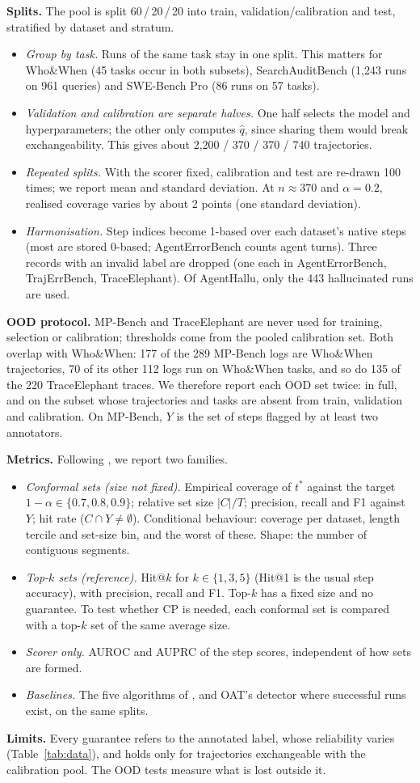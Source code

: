 \documentclass[10pt,a4paper]{article}
\newcommand{\tstar}{t^{*}}
\newcommand{\qhat}{\hat q}
\newcommand{\C}{C}
\begin{document}
\textbf{Splits.} The pool is split 60\,/\,20\,/\,20 into train, validation/calibration and test, stratified by dataset and stratum.
\begin{itemize}
\item \emph{Group by task.} Runs of the same task stay in one split. This matters for Who\&When (45 tasks occur in both subsets), SearchAuditBench (1{,}243 runs on 961 queries) and SWE-Bench Pro (86 runs on 57 tasks).
\item \emph{Validation and calibration are separate halves.} One half selects the model and hyperparameters; the other only computes $\qhat$, since sharing them would break exchangeability. This gives about 2{,}200 / 370 / 370 / 740 trajectories.
\item \emph{Repeated splits.} With the scorer fixed, calibration and test are re-drawn 100 times; we report mean and standard deviation. At $n\approx370$ and $\alpha=0.2$, realised coverage varies by about 2 points (one standard deviation).
\item \emph{Harmonisation.} Step indices become 1-based over each dataset's native steps (most are stored 0-based; AgentErrorBench counts agent turns). Three records with an invalid label are dropped (one each in AgentErrorBench, TrajErrBench, TraceElephant). Of AgentHallu, only the 443 hallucinated runs are used.
\end{itemize}

\textbf{OOD protocol.} MP-Bench and TraceElephant are never used for training, selection or calibration; thresholds come from the pooled calibration set. Both overlap with Who\&When: 177 of the 289 MP-Bench logs are Who\&When trajectories, 70 of its other 112 logs run on Who\&When tasks, and so do 135 of the 220 TraceElephant traces. We therefore report each OOD set twice: in full, and on the subset whose trajectories and tasks are absent from train, validation and calibration. On MP-Bench, $Y$ is the set of steps flagged by at least two annotators.

\textbf{Metrics.} Following \cite{yeh2026oat}, we report two families.
\begin{itemize}
\item \emph{Conformal sets (size not fixed).} Empirical coverage of $\tstar$ against the target $1-\alpha\in\{0.7,0.8,0.9\}$; relative set size $|\C|/T$; precision, recall and F1 against $Y$; hit rate ($\C\cap Y\neq\emptyset$). Conditional behaviour: coverage per dataset, length tercile and set-size bin, and the worst of these. Shape: the number of contiguous segments.
\item \emph{Top-$k$ sets (reference).} Hit@$k$ for $k\in\{1,3,5\}$ (Hit@1 is the usual step accuracy), with precision, recall and F1. Top-$k$ has a fixed size and no guarantee. To test whether CP is needed, each conformal set is compared with a top-$k$ set of the same average size.
\item \emph{Scorer only.} AUROC and AUPRC of the step scores, independent of how sets are formed.
\item \emph{Baselines.} The five algorithms of \cite{feng2026conformal}, and OAT's detector where successful runs exist, on the same splits.
\end{itemize}

\textbf{Limits.} Every guarantee refers to the annotated label, whose reliability varies (Table~\ref{tab:data}), and holds only for trajectories exchangeable with the calibration pool. The OOD tests measure what is lost outside it.



\end{document}
